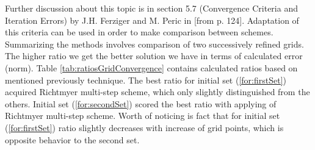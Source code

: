 	Further discussion about this topic is in section 5.7 (Convergence Criteria and Iteration Errors) by J.H. Ferziger and M. Peric in \cite{bib:ferzinger}[from p. 124]. Adaptation of this criteria can be used in order to make comparison between schemes. Summarizing the methods involves comparison of two successively refined grids. The higher ratio we get the better solution we have in terms of calculated error (norm). Table \ref{tab:ratiosGridConvergence} contains calculated ratios based on mentioned previously technique. The best ratio for initial set (\ref{for:firstSet}) acquired Richtmyer multi-step scheme, which only slightly distinguished from the others. Initial set (\ref{for:secondSet}) scored the best ratio with applying of Richtmyer multi-step scheme. Worth of noticing is fact that for initial set (\ref{for:firstSet}) ratio slightly decreases with increase of grid points, which is opposite behavior to the second set.
	

